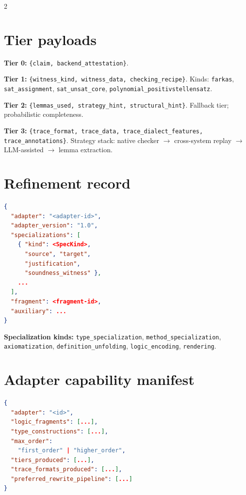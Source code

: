 \documentclass[10pt,letterpaper]{article}
\begin{document}
\begin{multicols}{2}
\section{Tier payloads}

\textbf{Tier 0:} \texttt{\{claim, backend\_attestation\}}.

\textbf{Tier 1:} \texttt{\{witness\_kind, witness\_data, checking\_recipe\}}.
Kinds: \texttt{farkas}, \texttt{sat\_assignment},
\texttt{sat\_unsat\_core}, \texttt{polynomial\_positivstellensatz}.

\textbf{Tier 2:} \texttt{\{lemmas\_used, strategy\_hint, structural\_hint\}}.
Fallback tier; probabilistic completeness.

\textbf{Tier 3:} \texttt{\{trace\_format, trace\_data,
trace\_dialect\_features, trace\_annotations\}}. Strategy stack:
native checker $\to$ cross-system replay $\to$ LLM-assisted $\to$ lemma extraction.

\section{Refinement record}

\begin{lstlisting}[language=json]
{
  "adapter": "<adapter-id>",
  "adapter_version": "1.0",
  "specializations": [
    { "kind": <SpecKind>,
      "source", "target",
      "justification",
      "soundness_witness" },
    ...
  ],
  "fragment": <fragment-id>,
  "auxiliary": ...
}
\end{lstlisting}

\textbf{Specialization kinds:}
\texttt{type\_specialization},
\texttt{method\_specialization},
\texttt{axiomatization},
\texttt{definition\_unfolding},
\texttt{logic\_encoding},
\texttt{rendering}.

\section{Adapter capability manifest}

\begin{lstlisting}[language=json]
{
  "adapter": "<id>",
  "logic_fragments": [...],
  "type_constructions": [...],
  "max_order":
    "first_order" | "higher_order",
  "tiers_produced": [...],
  "trace_formats_produced": [...],
  "preferred_rewrite_pipeline": [...]
}
\end{lstlisting}

\end{multicols}
\end{document}
